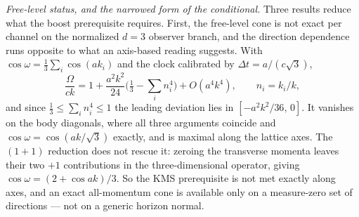 \documentclass[
]{article}
\begin{document}
\emph{Free-level status, and the narrowed form of the conditional.}
Three results reduce what the boost prerequisite requires. First, the
free-level cone is not exact per channel on the normalized \(d=3\)
observer branch, and the direction dependence runs opposite to what an
axis-based reading suggests. With
\(\cos\omega=\tfrac13\sum_i\cos(ak_i)\) and the clock calibrated by
\(\Delta t=a/(c\sqrt3)\), \[
\frac{\Omega}{ck}=1+\frac{a^2k^2}{24}\Big(\tfrac13-\sum_i n_i^4\Big)+O(a^4k^4),\qquad n_i=k_i/k,
\] and since \(\tfrac13\le\sum_i n_i^4\le1\) the leading deviation lies
in \([-a^2k^2/36,\,0]\). It vanishes on the body diagonals, where all
three arguments coincide and \(\cos\omega=\cos(ak/\sqrt3)\) exactly, and
is maximal along the lattice axes. The \((1{+}1)\) reduction does not
rescue it: zeroing the transverse momenta leaves their two \(+1\)
contributions in the three-dimensional operator, giving
\(\cos\omega=(2+\cos ak)/3\). So the KMS prerequisite is not met exactly
along axes, and an exact all-momentum cone is available only on a
measure-zero set of directions --- not on a generic horizon normal.
\end{document}
